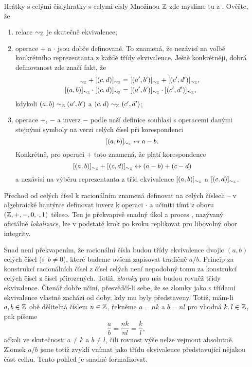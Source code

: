 \begin{exercise}{Hrátky s celými čísly}{hratky-s-celymi-cisly}
 Množinou $\mathbb{Z}$ zde myslíme tu z . Ověřte, že
 \begin{enumerate}
  \item relace $ \sim _{\mathbb{Z}}$ je skutečně ekvivalence;
  \item operace $+$ a $ \cdot $ jsou dobře definované. To znamená, že nezávisí
   na volbě konkrétního reprezentanta z každé třídy ekvivalence. Ještě
   konkrétněji, dobrá definovanost zde značí fakt, že
   \begin{align*}
    [(a,b)]_{ \sim_{\Z}} + [(c,d)]_{ \sim _{\Z}} &= [(a',b')]_{ \sim _{\Z}} +
    [(c',d')]_{ \sim _{\Z}},\\
    [(a,b)]_{ \sim_{\Z}} \cdot [(c,d)]_{ \sim _{\Z}} &= [(a',b')]_{ \sim _{\Z}}
    \cdot [(c',d')]_{ \sim _{\Z}},
   \end{align*}
   kdykoli $(a,b) \sim _{\mathbb{Z}} (a',b')$ a $(c,d) \sim _{\mathbb{Z}} (c',d')$;
  \item operace $+$, $-$ a inverz $-$ podle naší definice souhlasí s operacemi
   danými stejnými symboly na  verzi celých čísel při korespondenci
   \[
    [(a,b)]_{ \sim_{\mathbb{Z}}} \leftrightarrow a - b.
   \]
   Konkrétně, pro operaci $+$ toto znamená, že platí korespondence
   \[
    [(a,b)]_{ \sim_{\mathbb{Z}}} + [(c,d)]_{ \sim _{\mathbb{Z}}} \leftrightarrow (a - b) + (c -
    d)
   \]
   a nezávisí na výběru reprezentanta z tříd ekvivalence $[(a,b)]_{ \sim _{\mathbb{Z}}}$
   a $[(c,d)]_{ \sim_{\mathbb{Z}}}$.
 \end{enumerate}
\end{exercise}

Přechod od celých čísel k racionálním znamená definovat na celých číslech
 -- v algebraické hantýrce definovat inverz k operaci $ \cdot $ a
učiniti tímť z oboru $(\mathbb{Z},+,-,0, \cdot ,1)$ těleso. Ten je překvapivě snadný
úkol a proces , nazývaný oficiálně \emph{lokalizace}, lze v
podstatě krok po kroku replikovat pro libovolný obor integrity.

Snad není překvapením, že racionální čísla budou třídy ekvivalence dvojic
$(a,b)$ celých čísel (s~$b \neq 0$), které budeme ovšem zapisovat tradičně $a /
b$. Princip za konstrukcí racionálních čísel z čísel celých není nepodobný tomu
za konstrukcí celých čísel z čísel přirozených. Totiž, \emph{zlomky} pro nás
budou rovněž třídy ekvivalence. Čtenář dobře učiní, přesvědčí-li sebe, že se
zlomky jako s třídami ekvivalence vlastně zachází od doby, kdy mu byly
představeny. Totiž, mám-li $a,b \in \mathbb{Z}$ obě dělitelná číslem $n \in \mathbb{Z}$, řekněme
$a = nk$ a $b = nl$ pro vhodná $k,l \in \mathbb{Z}$, pak píšeme
\[
 \frac{a}{b} = \frac{nk}{nl} = \frac{k}{l},
\]
ačkoli ve skutečnosti $a \neq k$ a $b \neq l$, čili rovnost výše nelze vejmout
absolutně. Zlomek $a / b$ jsme totiž zvyklí vnímat jako třídu ekvivalence
představující nějakou část celku. Tento pohled je snadné formalizovat.

